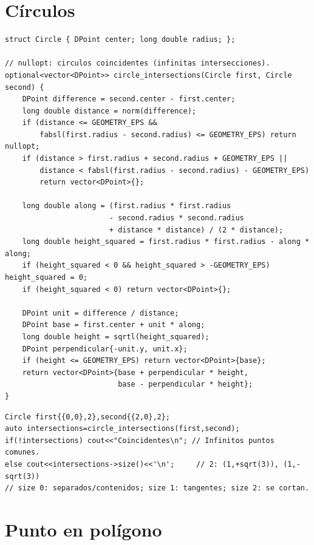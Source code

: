 \section{C\'irculos}

\begin{lstlisting}[style=cpp]
struct Circle { DPoint center; long double radius; };

// nullopt: circulos coincidentes (infinitas intersecciones).
optional<vector<DPoint>> circle_intersections(Circle first, Circle second) {
    DPoint difference = second.center - first.center;
    long double distance = norm(difference);
    if (distance <= GEOMETRY_EPS &&
        fabsl(first.radius - second.radius) <= GEOMETRY_EPS) return nullopt;
    if (distance > first.radius + second.radius + GEOMETRY_EPS ||
        distance < fabsl(first.radius - second.radius) - GEOMETRY_EPS)
        return vector<DPoint>{};

    long double along = (first.radius * first.radius
                        - second.radius * second.radius
                        + distance * distance) / (2 * distance);
    long double height_squared = first.radius * first.radius - along * along;
    if (height_squared < 0 && height_squared > -GEOMETRY_EPS) height_squared = 0;
    if (height_squared < 0) return vector<DPoint>{};

    DPoint unit = difference / distance;
    DPoint base = first.center + unit * along;
    long double height = sqrtl(height_squared);
    DPoint perpendicular{-unit.y, unit.x};
    if (height <= GEOMETRY_EPS) return vector<DPoint>{base};
    return vector<DPoint>{base + perpendicular * height,
                          base - perpendicular * height};
}
\end{lstlisting}

\begin{lstlisting}[style=cpp]
Circle first{{0,0},2},second{{2,0},2};
auto intersections=circle_intersections(first,second);
if(!intersections) cout<<"Coincidentes\n"; // Infinitos puntos comunes.
else cout<<intersections->size()<<'\n';     // 2: (1,+sqrt(3)), (1,-sqrt(3))
// size 0: separados/contenidos; size 1: tangentes; size 2: se cortan.
\end{lstlisting}

\section{Punto en pol\'igono}

